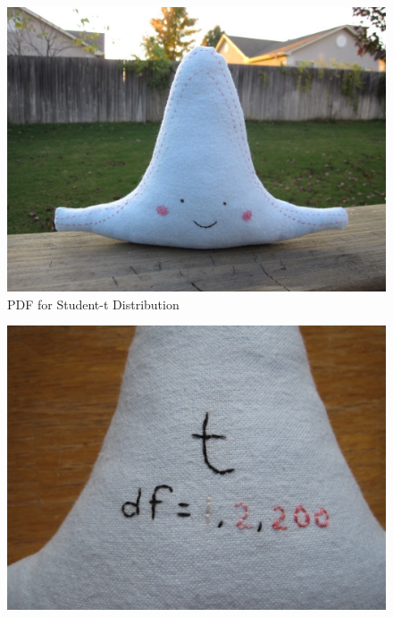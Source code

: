 \documentclass[handout]{beamer}
\begin{document}

\begin{frame}
\begin{figure}
\includegraphics[scale = 0.2]{./images/t_etsy1}
\caption{PDF for Student-t Distribution}
\end{figure}
\end{frame}

\begin{frame}
\begin{figure}
\includegraphics[scale = 0.2]{./images/t_etsy2}
\end{figure}
\end{frame}
\end{document}
